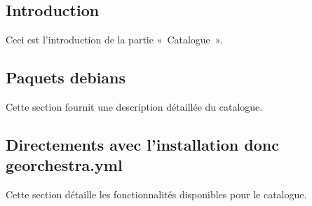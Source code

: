 \documentclass[letterpaper,10pt,french]{sphinxmanual}
\begin{document}
\subsection{Introduction}
\label{\detokenize{doc_instal/maj:introduction}}
\sphinxAtStartPar
Ceci est l’introduction de la partie « Catalogue ».


\subsection{Paquets debians}
\label{\detokenize{doc_instal/maj:paquets-debians}}
\sphinxAtStartPar
Cette section fournit une description détaillée du catalogue.


\subsection{Directements avec l’installation donc georchestra.yml}
\label{\detokenize{doc_instal/maj:directements-avec-l-installation-donc-georchestra-yml}}
\sphinxAtStartPar
Cette section détaille les fonctionnalités disponibles pour le catalogue.



\renewcommand{\indexname}{Index}
\printindex
\end{document}
